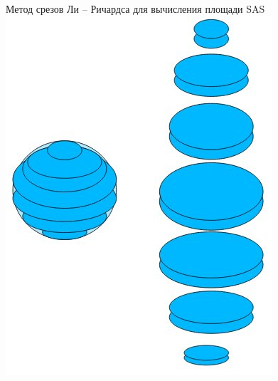 \documentclass{beamer}
\begin{document}
    \begin{frame}{Метод срезов Ли -- Ричардса
        для вычисления площади SAS}
        \includegraphics[height=0.7\textheight]{lee.jpg}
    \end{frame}
\end{document}
